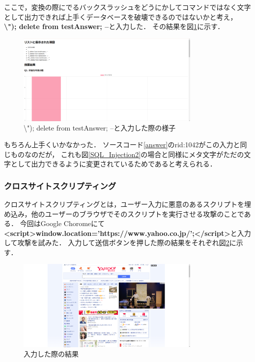 \documentclass[titlepage,a4paper]{jsarticle}
\begin{document}
ここで，変換の際にでるバックスラッシュをどうにかしてコマンドではなく文字として出力できれば上手くデータベースを破壊できるのではないかと考え，
\textbf{\textbackslash "); delete from testAnswer; --}と入力した．
その結果を図\ref{back}に示す．
\begin{figure}[H]
  \centering
  \includegraphics[width=0.8\textwidth]{img/security/back.png}
  \caption{\textbackslash "); delete from testAnswer; --と入力した際の様子}
  \label{back}
\end{figure}
もちろん上手くいかなかった．
ソースコード\ref{answer}のrid:1042がこの入力と同じものなのだが，
これも図\ref{SQL_Injection2}の場合と同様にメタ文字がただの文字として出力できるように変更されているためであると考えられる．

\subsubsection{クロスサイトスクリプティング}\label{xss}
クロスサイトスクリプティングとは，ユーザー入力に悪意のあるスクリプトを埋め込み，他のユーザーのブラウザでそのスクリプトを実行させる攻撃のことである．
今回はGoogle Choromeにて\textbf{\textless script\textgreater window.location='https://www.yahoo.co.jp/';\textless /script\textgreater}と入力して攻撃を試みた．
入力して送信ボタンを押した際の結果をそれぞれ図\ref{script}に示す．

\begin{figure}[tb]
  \centering
  \includegraphics[width=0.8\textwidth]{img/security/yahoo.png}
  \caption{入力した際の結果}
  \label{script}
\end{figure}
\end{document}
